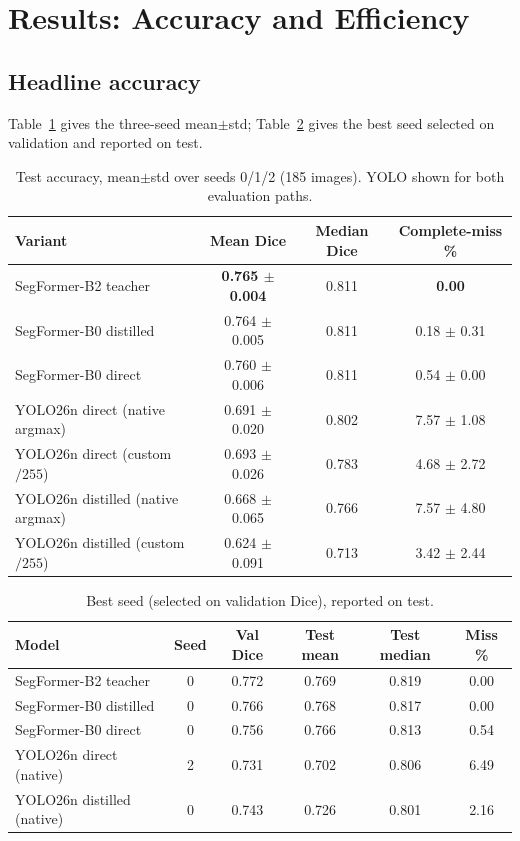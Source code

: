 \documentclass[11pt]{article}
\newcommand{\best}[1]{\textbf{#1}}
\begin{document}
\section{Results: Accuracy and Efficiency}
\subsection{Headline accuracy}
Table~\ref{tab:headline} gives the three-seed mean$\pm$std; Table~\ref{tab:best}
gives the best seed selected on validation and reported on test.

\begin{table}[h]
\centering
\caption{Test accuracy, mean$\pm$std over seeds 0/1/2 (185 images).
YOLO shown for both evaluation paths.}
\label{tab:headline}
\begin{tabular}{lccc}
\toprule
Variant & Mean Dice & Median Dice & Complete-miss \% \\
\midrule
SegFormer-B2 teacher            & \best{0.765 $\pm$ 0.004} & 0.811 & \best{0.00} \\
SegFormer-B0 distilled          & 0.764 $\pm$ 0.005 & 0.811 & 0.18 $\pm$ 0.31 \\
SegFormer-B0 direct             & 0.760 $\pm$ 0.006 & 0.811 & 0.54 $\pm$ 0.00 \\
YOLO26n direct (native argmax)  & 0.691 $\pm$ 0.020 & 0.802 & 7.57 $\pm$ 1.08 \\
YOLO26n direct (custom $/255$)  & 0.693 $\pm$ 0.026 & 0.783 & 4.68 $\pm$ 2.72 \\
YOLO26n distilled (native argmax)& 0.668 $\pm$ 0.065 & 0.766 & 7.57 $\pm$ 4.80 \\
YOLO26n distilled (custom $/255$)& 0.624 $\pm$ 0.091 & 0.713 & 3.42 $\pm$ 2.44 \\
\bottomrule
\end{tabular}
\end{table}

\begin{table}[h]
\centering
\caption{Best seed (selected on validation Dice), reported on test.}
\label{tab:best}
\begin{tabular}{lccccc}
\toprule
Model & Seed & Val Dice & Test mean & Test median & Miss \% \\
\midrule
SegFormer-B2 teacher    & 0 & 0.772 & 0.769 & 0.819 & 0.00 \\
SegFormer-B0 distilled  & 0 & 0.766 & 0.768 & 0.817 & 0.00 \\
SegFormer-B0 direct     & 0 & 0.756 & 0.766 & 0.813 & 0.54 \\
YOLO26n direct (native) & 2 & 0.731 & 0.702 & 0.806 & 6.49 \\
YOLO26n distilled (native)& 0 & 0.743 & 0.726 & 0.801 & 2.16 \\
\bottomrule
\end{tabular}
\end{table}
\end{document}
